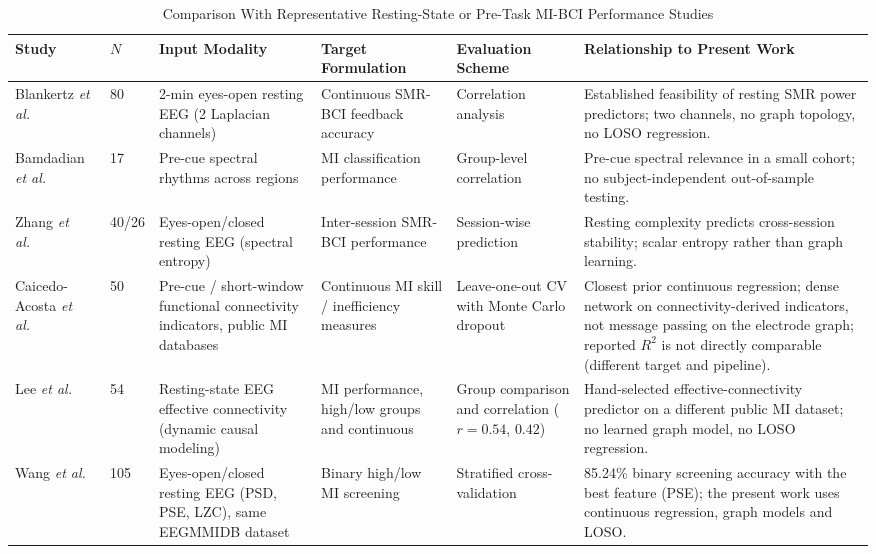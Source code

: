 \documentclass{ieeeaccess}
\begin{document}
\begin{table}[!t]
\caption{Comparison With Representative Resting-State or Pre-Task MI-BCI Performance Studies}
\label{tab:prior_comparison}
\centering
\scriptsize
\begin{tabularx}{\textwidth}{p{2.4cm}p{0.7cm}p{2.6cm}p{2.3cm}p{2.2cm}X}
\toprule
\textbf{Study} & \textbf{$N$} & \textbf{Input Modality} & \textbf{Target Formulation} & \textbf{Evaluation Scheme} & \textbf{Relationship to Present Work}\\
\midrule
Blankertz \textit{et al.}~\cite{blankertz2010} & 80 & 2-min eyes-open resting EEG (2 Laplacian channels) & Continuous SMR-BCI feedback accuracy & Correlation analysis & Established feasibility of resting SMR power predictors; two channels, no graph topology, no LOSO regression.\\
Bamdadian \textit{et al.}~\cite{bamdadian2014} & 17 & Pre-cue spectral rhythms across regions & MI classification performance & Group-level correlation & Pre-cue spectral relevance in a small cohort; no subject-independent out-of-sample testing.\\
Zhang \textit{et al.}~\cite{zhang2015entropy} & 40/26 & Eyes-open/closed resting EEG (spectral entropy) & Inter-session SMR-BCI performance & Session-wise prediction & Resting complexity predicts cross-session stability; scalar entropy rather than graph learning.\\
Caicedo-Acosta \textit{et al.}~\cite{caicedo2021} & 50 & Pre-cue / short-window functional connectivity indicators, public MI databases & Continuous MI skill / inefficiency measures & Leave-one-out CV with Monte Carlo dropout & Closest prior continuous regression; dense network on connectivity-derived indicators, not message passing on the electrode graph; reported $R^2$ is not directly comparable (different target and pipeline).\\
Lee \textit{et al.}~\cite{lee2020} & 54 & Resting-state EEG effective connectivity (dynamic causal modeling) & MI performance, high/low groups and continuous & Group comparison and correlation ($r=0.54$, $0.42$) & Hand-selected effective-connectivity predictor on a different public MI dataset; no learned graph model, no LOSO regression.\\
Wang \textit{et al.}~\cite{wang2022} & 105 & Eyes-open/closed resting EEG (PSD, PSE, LZC), same EEGMMIDB dataset & Binary high/low MI screening & Stratified cross-validation & 85.24\% binary screening accuracy with the best feature (PSE); the present work uses continuous regression, graph models and LOSO.\\

\end{tabularx}
\end{table}
\end{document}
